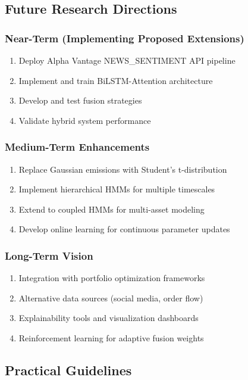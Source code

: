 \documentclass[conference]{IEEEtran}
\begin{document}
\subsection{Future Research Directions}

\subsubsection{Near-Term (Implementing Proposed Extensions)}
\begin{enumerate}
\item Deploy Alpha Vantage NEWS\_SENTIMENT API pipeline
\item Implement and train BiLSTM-Attention architecture
\item Develop and test fusion strategies
\item Validate hybrid system performance
\end{enumerate}

\subsubsection{Medium-Term Enhancements}
\begin{enumerate}
\item Replace Gaussian emissions with Student's t-distribution
\item Implement hierarchical HMMs for multiple timescales
\item Extend to coupled HMMs for multi-asset modeling
\item Develop online learning for continuous parameter updates
\end{enumerate}

\subsubsection{Long-Term Vision}
\begin{enumerate}
\item Integration with portfolio optimization frameworks
\item Alternative data sources (social media, order flow)
\item Explainability tools and visualization dashboards
\item Reinforcement learning for adaptive fusion weights
\end{enumerate}

\subsection{Practical Guidelines}
\end{document}
